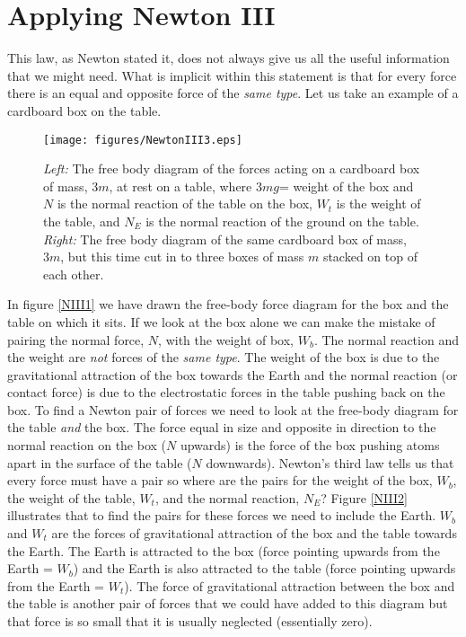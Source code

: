 \section{Applying Newton III}
This law, as Newton stated it, does not always give us all the useful information that we might need.  What is implicit within this statement is that for every force there is an equal and opposite force of the {\it same type}.  Let us take an example of a cardboard box on the table. \nl
\begin{wrapfigure}{r!}{8cm}
\center
\texttt{[image: figures/NewtonIII3.eps]}
\caption{{\it Left:} The free body diagram of the forces acting on a cardboard box of mass, $3m$, at rest on a table, where $3mg$= weight of the box and $N$ is the normal reaction of the table on the box, $W_t$ is the weight of the table, and $N_E$ is the normal reaction of the ground on the table.\\
{\it Right:}  The free body diagram of the same cardboard box of mass, $3m$,  but this time cut in to three boxes of mass $m$ stacked on top of each other. } \label{NIII3}
\end{wrapfigure}
In figure \ref{NIII1} we have drawn the free-body force diagram for the box and the table on which it sits.  If we look at the box alone we can make the mistake of pairing the normal force, $N$,  with the weight of box, $W_b$.  The normal reaction and the weight are {\it not} forces of the {\it same type}. The weight of the box is due to the gravitational attraction of the box towards the Earth and the normal reaction (or contact force) is due to the electrostatic forces in the table pushing back on the box. To find a Newton pair of forces we need to look at the free-body diagram for the table {\it and} the box. The force equal in size and opposite in direction to the normal reaction on the box ($N$ upwards) is the force of the box pushing atoms apart in the surface of the table ($N$ downwards).\nl
Newton's third law tells us that every force must have a pair so where are the pairs for the weight of the box, $W_b$, the weight of the table, $W_t$, and the normal reaction, $N_E$?  Figure \ref{NIII2} illustrates that to find the pairs for these forces we need to include the Earth.   $W_b$ and $W_t$ are the forces of gravitational attraction of the box and the table towards the Earth.  The Earth is attracted to the box (force pointing upwards from the Earth = $W_b$) and the Earth is also attracted to the table (force pointing upwards from the Earth = $W_t$).\nl
The force of gravitational attraction between the box and the table is another pair of forces that we could have added to this diagram but that force is so small that it is usually neglected (essentially zero).

